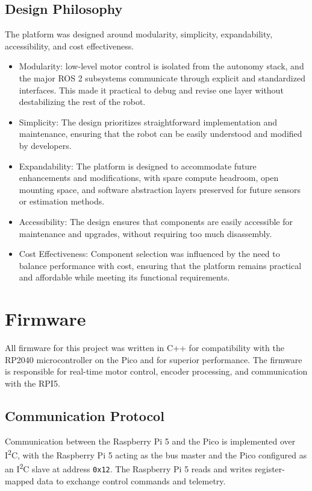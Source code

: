 \documentclass[11pt]{article}
\begin{document}
\subsection{Design Philosophy}
The platform was designed around modularity, simplicity, expandability, accessibility, and cost effectiveness. 
\begin{itemize}
    \item Modularity: low-level motor control is isolated from the autonomy stack, and the major ROS 2 subsystems
          communicate through explicit and standardized interfaces. This made it practical to debug and revise one layer
          without destabilizing the rest of the robot.
    \item Simplicity: The design prioritizes straightforward implementation and maintenance, ensuring that the robot can
          be easily understood and modified by developers.
    \item Expandability: The platform is designed to accommodate future enhancements and modifications, with spare
          compute headroom, open mounting space, and software abstraction layers preserved for future sensors or
          estimation methods.
    \item Accessibility: The design ensures that components are easily accessible for maintenance and upgrades, without
          requiring too much disassembly.
    \item Cost Effectiveness: Component selection was influenced by the need to balance performance with cost, ensuring
          that the platform remains practical and affordable while meeting its functional requirements.
\end{itemize}

\section{Firmware}
All firmware for this project was written in C++ for compatibility with the RP2040 microcontroller on the Pico and for
superior performance. The firmware is responsible for real-time motor control, encoder processing, and
communication with the RPI5.
\subsection{Communication Protocol}
Communication between the Raspberry Pi 5 and the Pico is implemented over I\textsuperscript{2}C, with the Raspberry Pi 5
acting as the bus master and the Pico configured as an I\textsuperscript{2}C slave at address \texttt{0x12}.
The Raspberry Pi 5 reads and writes register-mapped data to exchange control commands and telemetry.
\end{document}
